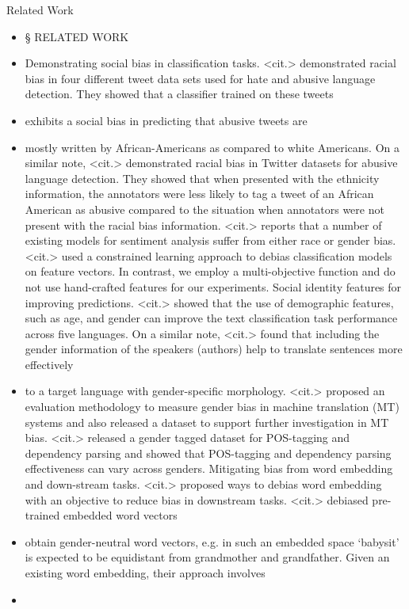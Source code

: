 \documentclass{beamer}
\begin{document}
\begin{frame}{Related Work}
%
\begin{itemize}
\item
§ RELATED WORK
\item
Demonstrating social bias in classification tasks. <cit.> demonstrated racial bias in four different tweet data sets used for hate and abusive language detection. They showed that a classifier trained on these tweets
\item
exhibits a social bias in predicting that abusive tweets are
\item
mostly written by African-Americans as compared to white Americans. On a similar note, <cit.> demonstrated racial bias in Twitter datasets for abusive language detection. They showed that when presented with the ethnicity information, the annotators were less likely to tag a tweet of an African American as abusive compared to the situation when annotators were not present with the racial bias information. <cit.> reports that a number of existing models for sentiment analysis suffer from either race or gender bias. <cit.> used a constrained learning approach to debias classification models on feature vectors. In contrast, we employ a multi-objective function and do not use hand-crafted features for our experiments. Social identity features for improving predictions. <cit.> showed that the use of demographic features, such as age, and gender can improve the text classification task performance across five languages. On a similar note, <cit.> found that including the gender information of the speakers (authors) help to translate sentences more effectively
\item
to a target language with gender-specific morphology. <cit.> proposed an evaluation methodology to measure gender bias in machine translation (MT) systems and also released a dataset to support further investigation in MT bias. <cit.> released a gender tagged dataset for POS-tagging and dependency parsing and showed that POS-tagging and dependency parsing effectiveness can vary across genders. Mitigating bias from word embedding and down-stream tasks. <cit.> proposed ways to debias word embedding with an objective to reduce bias in downstream tasks. <cit.> debiased pre-trained embedded word vectors
\item
obtain gender-neutral word vectors, e.g. in such an embedded space `babysit' is expected to be equidistant from grandmother and grandfather. Given an existing word embedding, their approach involves
\item

\end{itemize}
\end{frame}
\end{document}
